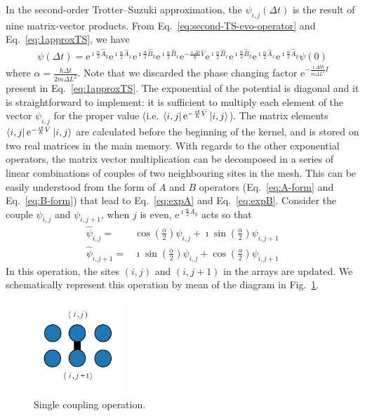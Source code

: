 In the second-order Trotter--Suzuki approximation, the $\psi_{i,j}(\Delta t)$ is the result of nine matrix-vector products. From Eq.~\eqref{eq:second-TS-evo-operator} and Eq.~\eqref{eq:1approxTS}, we have
\begin{align} \label{eq:single-iteration}
\psi(\Delta t) = \mathrm{e}^{\imath \frac{\alpha}{2} \hat{A}_y} \mathrm{e}^{\imath \frac{\alpha}{2} \hat{A}_x}   \mathrm{e}^{\imath \frac{\alpha}{2} \hat{B}_y} \mathrm{e}^{\imath \frac{\alpha}{2} \hat{B}_x}  \mathrm{e}^{-\frac{\imath \Delta t}{\hbar}\hat{V}} \mathrm{e}^{\imath \frac{\alpha}{2} \hat{B}_x} \mathrm{e}^{\imath \frac{\alpha}{2} \hat{B}_y} \mathrm{e}^{\imath \frac{\alpha}{2} \hat{A}_x} \mathrm{e}^{\imath \frac{\alpha}{2} \hat{A}_y} \psi(0)
\end{align}
where $\alpha = \frac{\hbar \Delta t}{2m\Delta L^2}$. Note that we discarded the phase changing factor $\mathrm{e}^{-\frac{\imath \Delta t \hbar}{m \Delta L^2} I}$ present in Eq.~\eqref{eq:1approxTS}. The exponential of the potential is diagonal and it is straightforward to implement: it is sufficient to multiply each element of the vector $\psi_{i,j}$ for the proper value (i.e. $\bra{i,j} \mathrm{e}^{-\frac{\imath t}{\hbar} \hat{V}} \ket{i,j}$). The matrix elements $\bra{i,j} \mathrm{e}^{-\frac{\imath t}{\hbar} \hat{V}} \ket{i,j}$ are calculated before the beginning of the kernel, and is stored on two real matrices in the main memory. With regards to the other exponential operators, the matrix vector multiplication can be decomposed in a series of linear combinations of couples of two neighbouring sites in the mesh. This can be easily understood from the form of $A$ and $B$ operators (Eq.~\eqref{eq:A-form} and Eq.~\eqref{eq:B-form}) that lead to Eq.~\eqref{eq:expA} and Eq.~\eqref{eq:expB}. Consider the couple $\psi_{i,j}$ and $\psi_{i,j+1}$, when $j$ is even, $\mathrm{e}^{\imath \frac{\alpha}{2} A_y}$ acts so that
\begin{align} \label{eq:single-coupling-operation}
\hat{\psi}_{i,j} = & \cos\left(\frac{\alpha}{2}\right) \psi_{i,j} + \imath \sin\left(\frac{\alpha}{2}\right) \psi_{i,j+1} \nonumber \\ 
\hat{\psi}_{i,j+1} = & \imath\sin\left(\frac{\alpha}{2}\right) \psi_{i,j} + \cos\left(\frac{\alpha}{2}\right) \psi_{i,j+1} 
\end{align}
In this operation, the sites $(i,j)$ and $(i,j+1)$ in the arrays are updated. We schematically represent this operation by mean of the diagram in Fig.~\ref{fig:scheme-single-iteration}.
\begin{figure}
   \centering
   \includegraphics[width=3.5cm]{Figs/Single_couple.pdf} %
   \caption{Single coupling operation.} \label{fig:scheme-single-iteration}
\end{figure}
